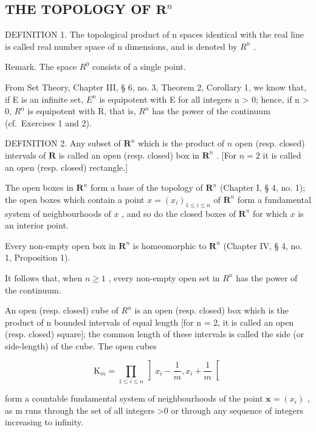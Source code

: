 \subsection{\texorpdfstring{THE TOPOLOGY OF \(\mathbf{R}^n\)}{THE TOPOLOGY OF R TO THE N}}

DEFINITION 1. The topological product of n spaces identical with the real line is called real number space of n dimensions, and is denoted by \(R^{n}\) .

Remark. The space \(R^{0}\) consists of a single point.

From Set Theory, Chapter III, § 6, no. 3, Theorem 2, Corollary 1, we know that, if E is an infinite set, \(E^{n}\) is equipotent with E for all integers n \textgreater{} 0; hence, if n \textgreater{} 0, \(R^{n}\) is equipotent with R, that is, \(R^{n}\) has the power of the continuum (cf.~Exercises 1 and 2).

DEFINITION 2. Any subset of \(\mathbf{R}^n\) which is the product of \(n\) open (resp. closed) intervals of \(\mathbf{R}\) is called an open (resp. closed) box in \(\mathbf{R}^n\) . {[}For \(n = 2\) it is called an open (resp. closed) rectangle.{]}

The open boxes in \(\mathbf{R}^n\) form a base of the topology of \(\mathbf{R}^n\) (Chapter I, § 4, no. 1); the open boxes which contain a point \(x = (x_i)_{1 \leqslant i \leqslant n}\) of \(\mathbf{R}^n\) form a fundamental system of neighbourhoods of \(x\) , and so do the closed boxes of \(\mathbf{R}^n\) for which \(x\) is an interior point.

Every non-empty open box in \(\mathbf{R}^n\) is homeomorphic to \(\mathbf{R}^n\) (Chapter IV, § 4, no. 1, Proposition 1).

It follows that, when \(n \geqslant 1\) , every non-empty open set in \(R^{n}\) has the power of the continuum.

An open (resp. closed) cube of \(R^{n}\) is an open (resp. closed) box which is the product of n bounded intervals of equal length {[}for n = 2, it is called an open (resp. closed) square{]}; the common length of these intervals is called the side (or side-length) of the cube. The open cubes

\[
\mathrm{K} _ {m} = \prod_ {1 \leqslant i \leqslant n} \left] x _ {i} - \frac {1}{m}, x _ {i} + \frac {1}{m} \right[
\]

form a countable fundamental system of neighbourhoods of the point \(\boldsymbol{x} = (x_{i})\) , as m runs through the set of all integers \textgreater0 or through any sequence of integers increasing to infinity.

